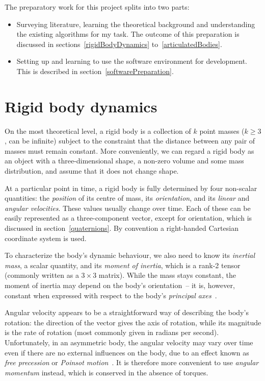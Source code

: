 The preparatory work for this project splits into two parts:
\begin{itemize}
\item Surveying literature, learning the theoretical background and understanding the existing
    algorithms for my task. The outcome of this preparation is discussed in
    sections~\ref{rigidBodyDynamics} to~\ref{articulatedBodies}.
\item Setting up and learning to use the software environment for development. This is described
    in section~\ref{softwarePreparation}.
\end{itemize}

\section{Rigid body dynamics\label{rigidBodyDynamics}}
On the most theoretical level, a rigid body is a collection of $k$ point masses ($k \ge 3$,
can be infinite) subject to the constraint that the distance between any pair of masses must
remain constant. More conveniently, we can regard a rigid body as an object with a
three-dimensional shape, a non-zero volume and some mass distribution, and assume that it does not
change shape.

At a particular point in time, a rigid body is fully determined by four non-scalar quantities: the
\emph{position} of its centre of mass, its \emph{orientation}, and its \emph{linear} and
\emph{angular velocities}. These values usually change over time. Each of these can be easily
represented as a three-component vector, except for orientation, which is discussed in
section~\ref{quaternions}. By convention a right-handed Cartesian coordinate system is used.

To characterize the body's dynamic behaviour, we also need to know its \emph{inertial mass},
a scalar quantity, and its \emph{moment of inertia}, which is a rank-2 tensor (commonly written
as a $3\times3$ matrix). While the mass stays constant, the moment of inertia may
depend on the body's orientation~-- it is, however, constant when expressed with respect to the
body's \emph{principal axes}~\cite{Feynman:63,Goldstein:80}.

Angular velocity appears to be a straightforward way of describing the body's rotation: the
direction of the vector gives the axis of rotation, while its magnitude is the rate of rotation
(most commonly given in radians per second). Unfortunately, in an asymmetric body, the angular
velocity may vary over time even if there are no external influences on the body, due to an effect
known as \emph{free precession} or \emph{Poinsot motion}~\cite{Goldstein:80,Julian:notes}. It is
therefore more convenient to use \emph{angular momentum} instead, which is conserved in the
absence of torques.

